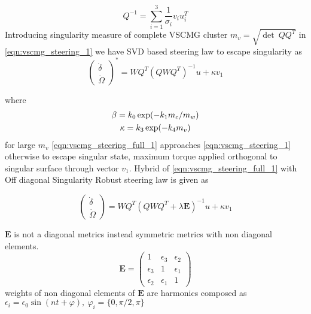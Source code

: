  
\begin{equation}
Q^{-1} =\sum ^{3}_{i=1}\frac{1}{\sigma _{i}} v_{i} u^{T}_{i}
\end{equation}
Introducing singularity measure of complete VSCMG cluster $\displaystyle m_{v} =\sqrt{\det \ QQ^{T}}$ in \autoref{eqn:vscmg_steering_1} we have SVD based steering law to escape singularity as
\begin{equation}
\begin{pmatrix}
\dot{\delta }\\
\dot{\Omega }
\end{pmatrix}^{*} =WQ^{T}\left( QWQ^{T}\right)^{-1} u+\kappa v_{1}
\label{eqn:vscmg_steering_full_1}
\end{equation}

where 
\begin{gather}
\beta =k_{0}\exp( -k_{1} m_{c} /m_{w}) \notag\\
\kappa =k_{3}\exp( -k_{4} m_{v})
\end{gather}
for large $\displaystyle m_{v}$ \autoref{eqn:vscmg_steering_full_1} approaches \autoref{eqn:vscmg_steering_1} otherwise to escape singular state, maximum torque applied orthogonal to singular surface through vector $\displaystyle v_{1}$.
Hybrid of \autoref{eqn:vscmg_steering_full_1} with Off diagonal Singularity Robust steering law is given as
\begin{tcolorbox}
\begin{equation}
\begin{pmatrix}
\dot{\delta }\\
\dot{\Omega }
\end{pmatrix} =WQ^{T}\left( QWQ^{T} +\lambda \mathbf{E}\right)^{-1} u+\kappa v_{1}
\label{eqn:vscmg_steering_full_HSR}
\end{equation}
\end{tcolorbox}

$\textbf{E}$ is not a diagonal metrics instead symmetric metrics with non diagonal elements.
\begin{equation}
\mathbf{E} =\begin{pmatrix}
1 & \epsilon _{3} & \epsilon _{2}\\
\epsilon _{3} & 1 & \epsilon _{1}\\
\epsilon _{2} & \epsilon _{1} &  1
\end{pmatrix}
\end{equation}
weights of non diagonal elements of $\textbf{E}$ are harmonics composed as
$\displaystyle \epsilon _{i} =\epsilon _{0}\sin( nt+\varphi ) ,\ \varphi _{i} =\{0,\pi /2,\pi \}$ 